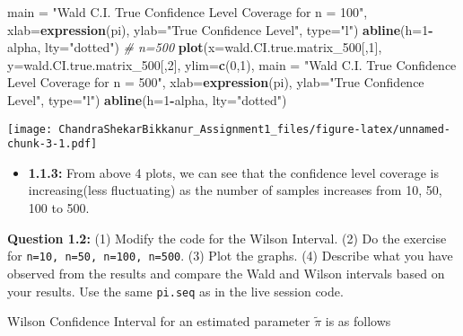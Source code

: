 \documentclass[]{article}
\newenvironment{Shaded}{\begin{snugshade}}{\end{snugshade}}
\newcommand{\CommentTok}[1]{\textcolor[rgb]{0.56,0.35,0.01}{\textit{#1}}}
\newcommand{\DataTypeTok}[1]{\textcolor[rgb]{0.13,0.29,0.53}{#1}}
\newcommand{\DecValTok}[1]{\textcolor[rgb]{0.00,0.00,0.81}{#1}}
\newcommand{\KeywordTok}[1]{\textcolor[rgb]{0.13,0.29,0.53}{\textbf{#1}}}
\newcommand{\NormalTok}[1]{#1}
\newcommand{\OperatorTok}[1]{\textcolor[rgb]{0.81,0.36,0.00}{\textbf{#1}}}
\newcommand{\StringTok}[1]{\textcolor[rgb]{0.31,0.60,0.02}{#1}}
\providecommand{\tightlist}{%
  \setlength{\itemsep}{0pt}\setlength{\parskip}{0pt}}
\begin{document}
\begin{Shaded}
\begin{Highlighting}[]
     \DataTypeTok{main =} \StringTok{"Wald C.I. True Confidence Level Coverage for n = 100"}\NormalTok{, }\DataTypeTok{xlab=}\KeywordTok{expression}\NormalTok{(pi),}
     \DataTypeTok{ylab=}\StringTok{"True Confidence Level"}\NormalTok{,}
     \DataTypeTok{type=}\StringTok{"l"}\NormalTok{)}
\KeywordTok{abline}\NormalTok{(}\DataTypeTok{h=}\DecValTok{1}\OperatorTok{-}\NormalTok{alpha, }\DataTypeTok{lty=}\StringTok{"dotted"}\NormalTok{)}
\CommentTok{# n=500}
\KeywordTok{plot}\NormalTok{(}\DataTypeTok{x=}\NormalTok{wald.CI.true.matrix_}\DecValTok{500}\NormalTok{[,}\DecValTok{1}\NormalTok{],}
     \DataTypeTok{y=}\NormalTok{wald.CI.true.matrix_}\DecValTok{500}\NormalTok{[,}\DecValTok{2}\NormalTok{],}
     \DataTypeTok{ylim=}\KeywordTok{c}\NormalTok{(}\DecValTok{0}\NormalTok{,}\DecValTok{1}\NormalTok{),}
     \DataTypeTok{main =} \StringTok{"Wald C.I. True Confidence Level Coverage for n = 500"}\NormalTok{, }\DataTypeTok{xlab=}\KeywordTok{expression}\NormalTok{(pi),}
     \DataTypeTok{ylab=}\StringTok{"True Confidence Level"}\NormalTok{,}
     \DataTypeTok{type=}\StringTok{"l"}\NormalTok{)}
\KeywordTok{abline}\NormalTok{(}\DataTypeTok{h=}\DecValTok{1}\OperatorTok{-}\NormalTok{alpha, }\DataTypeTok{lty=}\StringTok{"dotted"}\NormalTok{)}
\end{Highlighting}
\end{Shaded}

\texttt{[image: ChandraShekarBikkanur\_Assignment1\_files/figure-latex/unnamed-chunk-3-1.pdf]}

\vspace{0.25in}

\begin{itemize}
\tightlist
\item
  \textbf{1.1.3:} From above 4 plots, we can see that the confidence
  level coverage is increasing(less fluctuating) as the number of
  samples increases from 10, 50, 100 to 500.
\end{itemize}

\vspace{0.45in}

\textbf{Question 1.2:} (1) Modify the code for the Wilson Interval. (2)
Do the exercise for \texttt{n=10,\ n=50,\ n=100,\ n=500}. (3) Plot the
graphs. (4) Describe what you have observed from the results and compare
the Wald and Wilson intervals based on your results. Use the same
\texttt{pi.seq} as in the live session code.

\vspace{0.25in}

Wilson Confidence Interval for an estimated parameter \(\tilde{\pi}\) is
as follows
\end{document}
